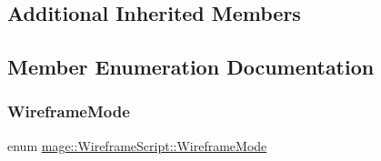 \subsection*{Additional Inherited Members}


\subsection{Member Enumeration Documentation}
\hypertarget{classmage_1_1_wireframe_script_a99d65e77e89c2581544e68030adcefb7}{}\label{classmage_1_1_wireframe_script_a99d65e77e89c2581544e68030adcefb7} 
\subsubsection{\texorpdfstring{Wireframe\+Mode}{WireframeMode}}
{\footnotesize\ttfamily enum \hyperlink{classmage_1_1_wireframe_script_a99d65e77e89c2581544e68030adcefb7}{mage\+::\+Wireframe\+Script\+::\+Wireframe\+Mode}}

